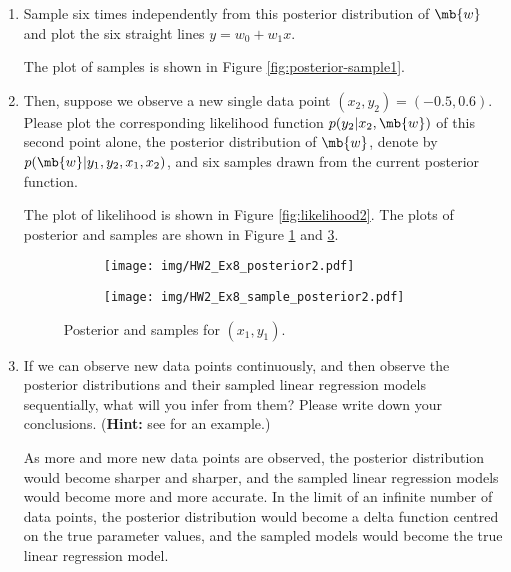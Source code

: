 \begin{exercise}
\begin{enumerate}
        \item Sample six times independently from this posterior distribution of $\mb{w}$ and plot the six straight lines $y=w_0+w_1x$.
            \begin{solution}
                The plot of samples is shown in Figure \ref{fig:posterior-sample1}.
                \qedhere
            \end{solution}
        \item Then, suppose we observe a new single data point $(x_2,y_2)=(-0.5,0.6)$. Please plot the corresponding likelihood function $p(y_2|x_2,\mb{w})$ of this second point alone, the posterior distribution of $\mb{w}$, denote by $p(\mb{w}|y_1,y_2,x_1,x_2)$, and six samples drawn from the current posterior function.
            \begin{solution}
                The plot of likelihood is shown in Figure \ref{fig:likelihood2}.
                The plots of posterior and samples are shown in Figure \ref{fig:posterior2} and \ref{fig:posterior-sample2}.
                \qedhere
                \begin{figure}[H]
                    \centering
                    \begin{subfigure}{0.5\textwidth}
                        \texttt{[image: img/HW2\_Ex8\_posterior2.pdf]}
                        \label{fig:posterior2}
                    \end{subfigure}
                    \hfill
                    \begin{subfigure}{0.45\textwidth}
                        \texttt{[image: img/HW2\_Ex8\_sample\_posterior2.pdf]}
                        \label{fig:posterior-sample2}
                    \end{subfigure}
                    \caption{Posterior and samples for $(x_1,y_1)$.}
                \end{figure}
            \end{solution}
        \item If we can observe new data points continuously, and then observe the posterior distributions and their sampled linear regression models sequentially, what will you infer from them? Please write down your conclusions.
            (\textbf{Hint:} see \cite{Bishop2006} for an example.)
            
            \begin{solution}
                As more and more new data points are observed, the posterior distribution would become sharper and sharper, and the sampled linear regression models would become more and more accurate. In the limit of an infinite number of data points, the posterior distribution would become a delta function centred on the true parameter values, and the sampled models would become the true linear regression model.
                \qedhere
            \end{solution}
            

\end{enumerate}
\end{exercise}
